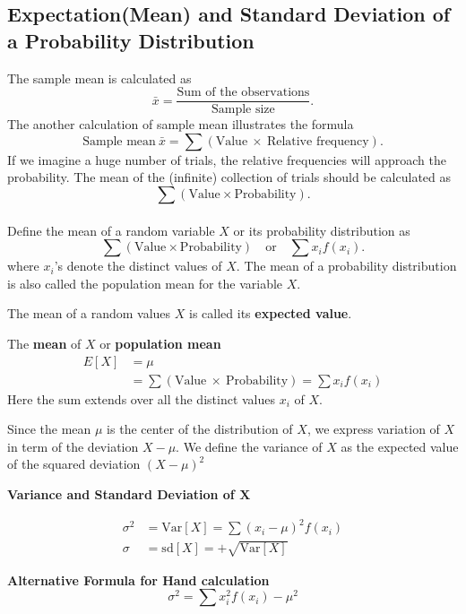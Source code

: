 \documentclass[12pt,openany]{book}
\theoremstyle{definition}
\newcommand{\Var}{\text{Var}}
\newcommand{\sd}{\text{sd}}
\begin{document}
	\subsection{Expectation(Mean) and Standard Deviation of a Probability Distribution}
	The sample mean is calculated as \[
	\bar{x}=\frac{\text{Sum of the observations}}{\text{Sample size}}.
	\] The another calculation of sample mean illustrates the formula \[
	\text{Sample mean}\ \bar{x} = \sum(\text{Value}\ \times\ \text{Relative frequency}).
	\] If we imagine a huge number of trials, the relative frequencies will approach the probability. The mean of the (infinite) collection of trials should be calculated as \[
	\sum(\text{Value}\times\text{Probability}).
	\]
	\\
	Define the mean of a random variable $X$ or its probability distribution as \[
	\sum(\text{Value}\times\text{Probability})\quad\text{or}\quad \sum x_if(x_i).
	\] where $x_i$'s denote the distinct values of $X$. The mean of a probability distribution is also called the population mean for the variable $X$. \par
	The mean of a random values $X$ is called its \textbf{expected value}. \begin{tcolorbox}[colback=white]
		The \textbf{mean} of $X$ or \textbf{population mean} \begin{align*}
		E[X] &= \mu \\
		&= \sum(\text{Value}\ \times\ \text{Probability})=\sum x_if(x_i)
		\end{align*} Here the sum extends over all the distinct values $x_i$ of $X$.
	\end{tcolorbox}
	Since the mean $\mu$ is the center of the distribution of $X$, we express variation of $X$ in term of the deviation $X-\mu$. We define the variance of $X$ as the expected value of the squared deviation $(X-\mu)^2$
	\begin{tcolorbox}[colback=white]\begin{center}
			\textbf{Variance and Standard Deviation of $\boldsymbol{X}$}
		\end{center}\begin{align*}
		\sigma^2 &=\Var[X]=\sum(x_i-\mu)^2f(x_i) \\
		\sigma &=\sd[X]= +\sqrt{\Var[X]}
		\end{align*}
	\end{tcolorbox}
	\begin{tcolorbox}[colback=white]
		\centering
		\textbf{Alternative Formula for Hand calculation} \[
		\sigma^2=\sum x_i^2f(x_i) - \mu^2
		\]
	\end{tcolorbox}\ \\
\end{document}

